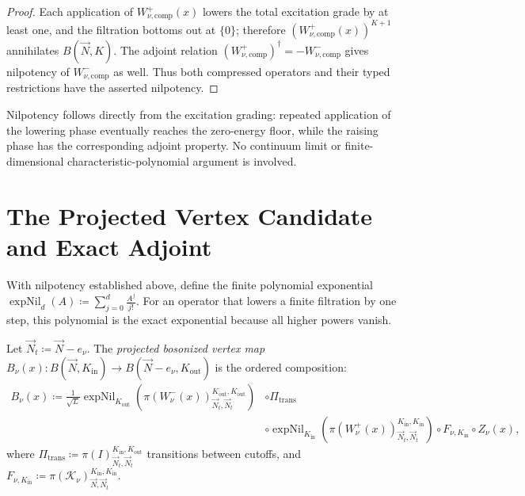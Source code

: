 \begin{proof}
Each application of $W^+_{\nu,\mathrm{comp}}(x)$ lowers the total excitation grade by at least one, and the filtration bottoms out at $\{0\}$; therefore $(W^+_{\nu,\mathrm{comp}}(x))^{K+1}$ annihilates $B(\vec{N},K)$. The adjoint relation $(W^+_{\nu,\mathrm{comp}})^\dagger=-W^-_{\nu,\mathrm{comp}}$ gives nilpotency of $W^-_{\nu,\mathrm{comp}}$ as well. Thus both compressed operators and their typed restrictions have the asserted nilpotency.
\end{proof}

\begin{remark}
Nilpotency follows directly from the excitation grading: repeated application of the lowering phase eventually reaches the zero-energy floor, while the raising phase has the corresponding adjoint property. No continuum limit or finite-dimensional characteristic-polynomial argument is involved.
\end{remark}

\section{The Projected Vertex Candidate and Exact Adjoint}

With nilpotency established above, define the finite polynomial exponential $\operatorname{expNil}_d(A) \coloneqq \sum_{j=0}^d \frac{A^j}{j!}$. For an operator that lowers a finite filtration by one step, this polynomial is the exact exponential because all higher powers vanish.

\begin{definition}
\label{def:vertex_candidate}
Let $\vec{N}_t \coloneqq \vec{N} - e_\nu$. The \emph{projected bosonized vertex map}
$B_\nu(x) : B(\vec{N}, K_{\mathrm{in}}) \to B(\vec{N} - e_\nu, K_{\mathrm{out}})$
is the ordered composition:
\begin{equation}
\label{eq:vertex_candidate_formula}
\begin{aligned}
B_\nu(x) \coloneqq \frac{1}{\sqrt{L}} \operatorname{expNil}_{K_{\mathrm{out}}}\!\left( \pi(W^-_\nu(x))_{\vec{N}_t, \vec{N}_t}^{K_{\mathrm{out}}, K_{\mathrm{out}}} \right) &\circ \Pi_{\mathrm{trans}} \\
&\circ \operatorname{expNil}_{K_{\mathrm{in}}}\!\left( \pi(W^+_\nu(x))_{\vec{N}_t, \vec{N}_t}^{K_{\mathrm{in}}, K_{\mathrm{in}}} \right) \circ F_{\nu, K_{\mathrm{in}}} \circ Z_\nu(x),
\end{aligned}
\end{equation}
where $\Pi_{\mathrm{trans}} \coloneqq \pi(I)_{\vec{N}_t, \vec{N}_t}^{K_{\mathrm{in}}, K_{\mathrm{out}}}$ transitions between cutoffs, and $F_{\nu, K_{\mathrm{in}}} \coloneqq \pi(\mathcal{K}_\nu)_{\vec{N}, \vec{N}_t}^{K_{\mathrm{in}}, K_{\mathrm{in}}}$.
\end{definition}

